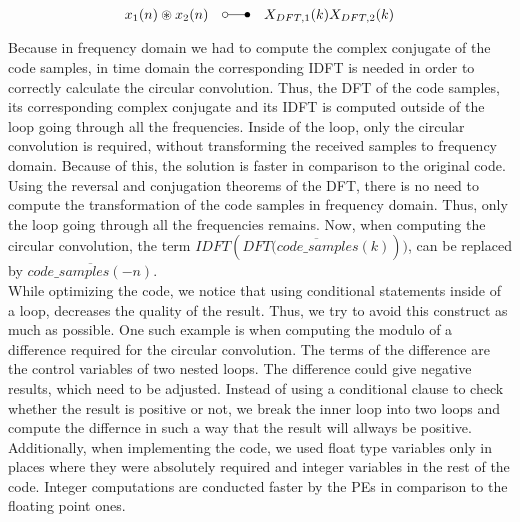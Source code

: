 			\begin{equation} 
				\label{eq:circular_conv}
				x_{1}(n) \circledast x_{2}(n)\quad \laplace\quad X_{DFT,1}(k)X_{DFT,2}(k)
			\end{equation} 

			Because in frequency domain we had to compute the complex conjugate of the code samples, in time domain the corresponding IDFT is needed in order to correctly calculate the circular convolution. Thus, the DFT of the code samples, its corresponding complex conjugate and its IDFT is computed outside of the loop going through all the frequencies. Inside of the loop, only the circular convolution is required, without transforming the received samples to frequency domain. Because of this, the solution is faster in comparison to the original code.\\
			Using the reversal and conjugation theorems of the DFT, there is no need to compute the transformation of the code samples in frequency domain. Thus, only the loop going through all the frequencies remains. Now, when computing the circular convolution, the term $IDFT(\overline{DFT(code\_samples(k)}))$, can be replaced by $\overline{code\_samples(-n)}$.\\ 
			While optimizing the code, we notice that using conditional statements inside of a loop, decreases the quality of the result. Thus, we try to avoid this construct as much as possible. One such example is when computing the modulo of a difference required for the circular convolution. The terms of the difference are the control variables of two nested loops. The difference could give negative results, which need to be adjusted. Instead of using a conditional clause to check whether the result is positive or not, we break the inner loop into two loops and compute the differnce in such a way that the result will allways be positive.\\
			Additionally, when implementing the code, we used float type variables only in places where they were absolutely required and integer variables in the rest of the code. Integer computations are conducted faster by the PEs in comparison to the floating point ones. 
	

